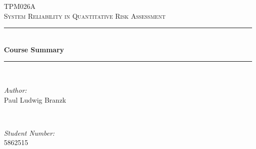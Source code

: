 \begin{titlepage}
\newcommand{\HRule}{\rule{\linewidth}{0.5mm}} %

\center %

\textsc{\LARGE TPM026A}\\[1.5cm] %
\textsc{\Large System Reliability in Quantitative Risk Assessment}\\[0.5cm] %

\HRule \\[0.4cm]
{ \huge \bfseries Course Summary}\\[0.4cm] %
\HRule \\[1.5cm]
 
\begin{minipage}{0.4\textwidth}
\begin{flushleft} \large
\emph{Author:}\\
Paul Ludwig Branzk %
\end{flushleft}
\end{minipage}
~
\begin{minipage}{0.4\textwidth}
\begin{flushright} \large
\emph{Student Number:} \\
5862515 %
\end{flushright}
\end{minipage}\\[2cm]



\end{titlepage}
